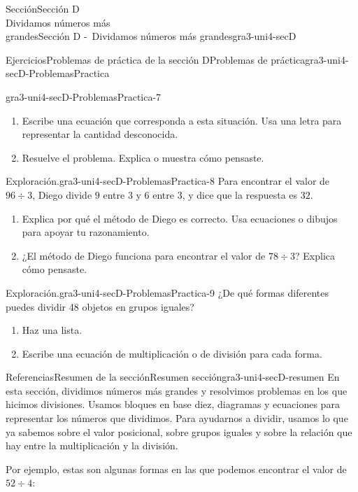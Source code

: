 \begin{sectionptx}{Sección}{{\Large Sección D\\}Dividamos números más\\grandes}{}{Sección D -~Dividamos números más grandes}{}{}{gra3-uni4-secD}
\begin{exercises-subsection}{Ejercicios}{Problemas de práctica de la sección D}{}{Problemas de práctica}{}{}{gra3-uni4-secD-ProblemasPractica}
\begin{divisionexercise}{5}{}{}{gra3-uni4-secD-ProblemasPractica-7}
\begin{enumerate}[label={(\alph*)}]
\item{}Escribe una ecuación que corresponda a esta situación. Usa una letra para representar la cantidad desconocida.%
\item{}Resuelve el problema. Explica o muestra cómo pensaste.%
\end{enumerate}
\end{divisionexercise}%
\begin{divisionexercise}{6}{Exploración.}{}{gra3-uni4-secD-ProblemasPractica-8}%
Para encontrar el valor de \(96 \div 3\), Diego divide \(9\) entre \(3\) y \(6\) entre \(3\), y dice que la respuesta es \(32\).%
%
\begin{enumerate}[label={(\alph*)}]
\item{}Explica por qué el método de Diego es correcto. Usa ecuaciones o dibujos para apoyar tu razonamiento.%
\item{}¿El método de Diego funciona para encontrar el valor de \(78 \div 3\)? Explica cómo pensaste.%
\end{enumerate}
\end{divisionexercise}%
\begin{divisionexercise}{7}{Exploración.}{}{gra3-uni4-secD-ProblemasPractica-9}%
¿De qué formas diferentes puedes dividir 48 objetos en grupos iguales?%
%
\begin{enumerate}[label={(\alph*)}]
\item{}Haz una lista.%
\item{}Escribe una ecuación de multiplicación o de división para cada forma.%
\end{enumerate}
\end{divisionexercise}%
\end{exercises-subsection}
%
%
\typeout{************************************************}
\typeout{************************************************}
%
\clearpage
\begin{references-subsection}{Referencias}{Resumen de la sección}{}{Resumen sección}{}{}{gra3-uni4-secD-resumen}
En esta sección, dividimos números más grandes y resolvimos problemas en los que hicimos divisiones. Usamos bloques en base diez, diagramas y ecuaciones para representar los números que dividimos. Para ayudarnos a dividir, usamos lo que ya sabemos sobre el valor posicional, sobre grupos iguales y sobre la relación que hay entre la multiplicación y la división.%
\par
Por ejemplo, estas son algunas formas en las que podemos encontrar el valor de \(52 \div 4\):%
%

\end{references-subsection}
\end{sectionptx}
